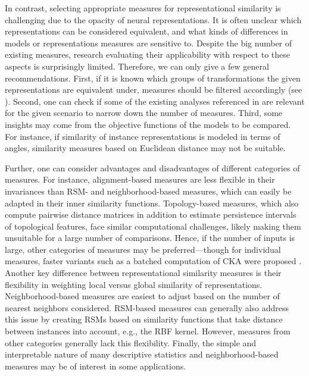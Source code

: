 \documentclass{article}
\begin{document}
In contrast, selecting appropriate measures for representational similarity is challenging due to the opacity of neural representations.
It is often unclear which representations can be considered equivalent, and what kinds of differences in models or representations measures are sensitive to.
Despite the big number of existing measures, research evaluating their applicability with respect to these aspects is surprisingly limited.
Therefore, we can only give a few general recommendations.
First, if it is known which groups of transformations the given representations are equivalent under, measures should be filtered accordingly (see ).
Second, one can check if some of the existing analyses referenced in  are relevant for the given scenario to narrow down the number of measures.
Third, some insights may come from the objective functions of the models to be compared.
For instance, if similarity of instance representations is modeled in terms of angles, similarity measures based on Euclidean distance may not be suitable.

Further, one can consider advantages and disadvantages of different categories of measures.
For instance, alignment-based measures are less flexible in their invariances than RSM- and neighborhood-based measures, which can easily be adapted in their inner similarity functions.
Topology-based measures, which also compute pairwise distance matrices in addition to estimate persistence intervals of topological features, face similar computational challenges, likely making them unsuitable for a large number of comparisons.
Hence, if the number of inputs is large, other categories of measures may be preferred---though for individual measures, faster variants such as a batched computation of CKA were proposed \cite{nguyen_origins_2022}.
Another key difference between representational similarity measures is their flexibility in weighting local versus global similarity of representations.
Neighborhood-based measures are easiest to adjust based on the number of nearest neighbors considered.
RSM-based measures can generally also address this issue by creating RSMs based on similarity functions that take distance between instances into account, e.g., the RBF kernel.
However, measures from other categories generally lack this flexibility.
Finally, the simple and interpretable nature of many descriptive statistics and neighborhood-based measures may be of interest in some applications.
\end{document}
